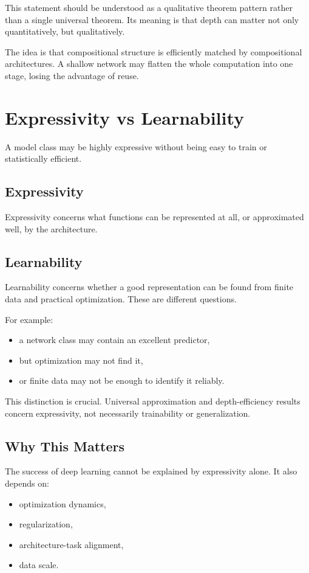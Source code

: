 This statement should be understood as a qualitative theorem pattern rather than a single universal theorem. Its meaning is that depth can matter not only quantitatively, but qualitatively.

The idea is that compositional structure is efficiently matched by compositional architectures. A shallow network may flatten the whole computation into one stage, losing the advantage of reuse.

\section{Expressivity vs Learnability}

A model class may be highly expressive without being easy to train or statistically efficient.

\subsection{Expressivity}

Expressivity concerns what functions can be represented at all, or approximated well, by the architecture.

\subsection{Learnability}

Learnability concerns whether a good representation can be found from finite data and practical optimization. These are different questions.

For example:
\begin{itemize}
    \item a network class may contain an excellent predictor,
    \item but optimization may not find it,
    \item or finite data may not be enough to identify it reliably.
\end{itemize}

This distinction is crucial. Universal approximation and depth-efficiency results concern expressivity, not necessarily trainability or generalization.

\subsection{Why This Matters}

The success of deep learning cannot be explained by expressivity alone. It also depends on:
\begin{itemize}
    \item optimization dynamics,
    \item regularization,
    \item architecture-task alignment,
    \item data scale.
\end{itemize}

